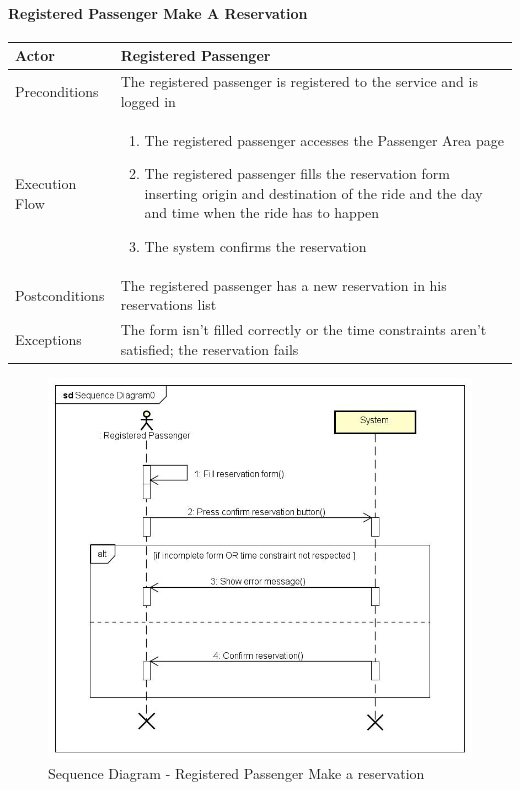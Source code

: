 \paragraph{Registered Passenger Make A Reservation}
\begin{center}
	\begin{tabular}{ | l | p{8cm} |}
		\hline
		Actor &  Registered Passenger	\\ \hline
		Preconditions & The registered passenger is registered to the service and is logged in	\\ \hline
		Execution Flow & \begin{enumerate}
			\item The registered passenger accesses the Passenger Area page
			\item The registered passenger fills the reservation form inserting origin and destination of the ride and the day and time when the ride has to happen
			\item The system confirms the reservation
		\end{enumerate}		\\ \hline
		Postconditions & The registered passenger has a new reservation in his reservations list	\\ \hline
		Exceptions & The form isn't filled correctly or the time constraints aren't satisfied; the reservation fails \\ \hline
	\end{tabular}
\end{center}
\newpage
\begin{landscape}
	\begin{figure}[!h]
		\begin{center}			
			\includegraphics[height=\textheight]{../SE2_SD/RegisteredPassengerReservation}
			\caption{Sequence Diagram - Registered Passenger Make a reservation}	
		\end{center}
	\end{figure}
\end{landscape}
\newpage
